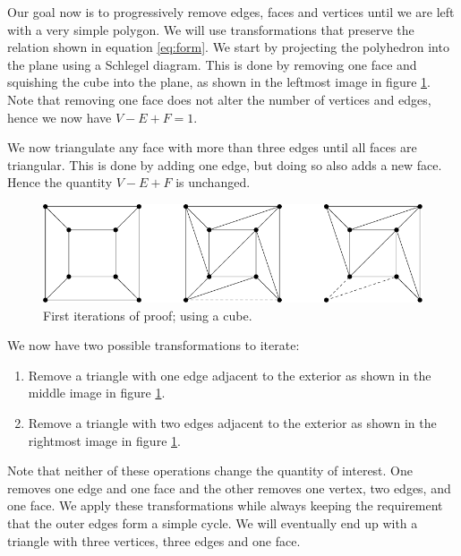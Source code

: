 \documentclass{amsart}
\theoremstyle{plain}
\theoremstyle{definition}
\begin{document}
Our goal now is to progressively remove edges, faces and vertices until we are
left with a very simple polygon. We will use transformations that preserve the
relation shown in equation \ref{eq:form}. We start by projecting the polyhedron
into the plane using a Schlegel diagram. This is done by removing one face and
squishing the cube into the plane, as shown in the leftmost image in figure
\ref{fig:proof}. Note that removing one face does not alter the number of
vertices and edges, hence we now have $V - E + F = 1$.

We now triangulate any face with more than three edges until all faces are
triangular. This is done by adding one edge, but doing so also adds a new face.
Hence the quantity $V - E + F$ is unchanged.

\begin{figure}[ht!]
    \centering
    \includegraphics{drawing.pdf}
    \caption{First iterations of proof; using a cube.}
    \label{fig:proof}
\end{figure}

We now have two possible transformations to iterate: 
\begin{enumerate}
    \item Remove a triangle with one edge adjacent to the exterior as shown in
        the middle image in figure \ref{fig:proof}.  
    \item Remove a triangle
        with two edges adjacent to the exterior as shown in the rightmost image
        in figure \ref{fig:proof}.
\end{enumerate}
Note that neither of these operations change the quantity of interest. One
removes one edge and one face and the other removes one vertex, two edges, and
one face. We apply these transformations while always keeping the requirement
that the outer edges form a simple cycle. We will eventually end up with a
triangle with three vertices, three edges and one face.
\end{document}
